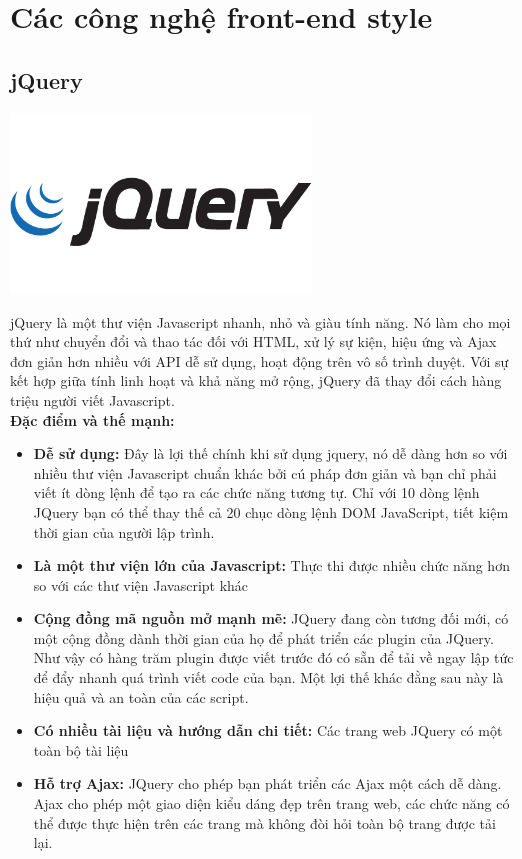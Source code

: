 \section{Các công nghệ front-end style}
\subsection{jQuery}
\begin{center}
  \captionsetup{type=figure}
  \includegraphics[width=8cm]{img/jquery-logo.jpg}
\end{center}

jQuery là một thư viện Javascript nhanh, nhỏ và giàu tính năng. Nó làm cho mọi thứ như chuyển đổi và thao tác đối với HTML, xử lý sự kiện, hiệu ứng và Ajax đơn giản hơn nhiều với API dễ sử dụng, hoạt động trên vô số trình duyệt. Với sự kết hợp giữa tính linh hoạt và khả năng mở rộng, jQuery đã thay đổi cách hàng triệu người viết Javascript.\\

\textbf{Đặc điểm và thế mạnh:}
\begin{itemize}
    \item \textbf{Dễ sử dụng:} Đây là lợi thế chính khi sử dụng jquery, nó dễ dàng hơn so với nhiều thư viện Javascript chuẩn khác bởi cú pháp đơn giản và bạn chỉ phải viết ít dòng lệnh để tạo ra các chức năng tương tự. Chỉ với 10 dòng lệnh JQuery bạn có thể thay thế cả 20 chục dòng lệnh DOM JavaScript, tiết kiệm thời gian của người lập trình.
    \item \textbf{Là một thư viện lớn của Javascript:} Thực thi được nhiều chức năng hơn so với các thư viện Javascript khác
    \item \textbf{Cộng đồng mã nguồn mở mạnh mẽ:} JQuery đang còn tương đối mới, có một cộng đồng dành thời gian của họ để phát triển các plugin của JQuery. Như vậy có hàng trăm plugin được viết trước đó có sẵn để tải về ngay lập tức để đẩy nhanh quá trình viết code của bạn. Một lợi thế khác đằng sau này là hiệu quả và an toàn của các script.
    \item \textbf{Có nhiều tài liệu và hướng dẫn chi tiết:} Các trang web JQuery có một toàn bộ tài liệu
    \item \textbf{Hỗ trợ Ajax:} JQuery cho phép bạn phát triển các Ajax một cách dễ dàng. Ajax cho phép một giao diện kiểu dáng đẹp trên trang web, các chức năng có thể được thực hiện trên các trang mà không đòi hỏi toàn bộ trang được tải lại.
\end{itemize}
